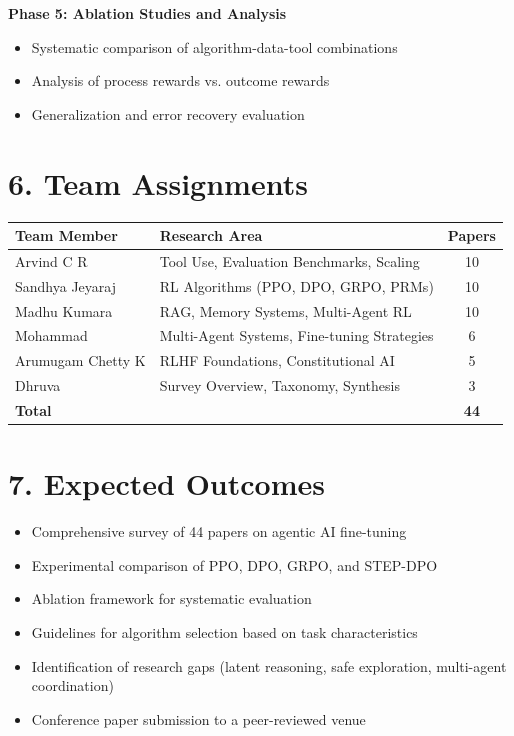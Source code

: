 \documentclass[12pt]{article}
\begin{document}
\textbf{Phase 5: Ablation Studies and Analysis}
\begin{itemize}
    \item Systematic comparison of algorithm-data-tool combinations
    \item Analysis of process rewards vs. outcome rewards
    \item Generalization and error recovery evaluation
\end{itemize}

\section*{6. Team Assignments}

\begin{table}[h]
\centering
\begin{tabular}{@{}llc@{}}
\toprule
\textbf{Team Member} & \textbf{Research Area} & \textbf{Papers} \\
\midrule
Arvind C R & Tool Use, Evaluation Benchmarks, Scaling & 10 \\
Sandhya Jeyaraj & RL Algorithms (PPO, DPO, GRPO, PRMs) & 10 \\
Madhu Kumara & RAG, Memory Systems, Multi-Agent RL & 10 \\
Mohammad & Multi-Agent Systems, Fine-tuning Strategies & 6 \\
Arumugam Chetty K & RLHF Foundations, Constitutional AI & 5 \\
Dhruva & Survey Overview, Taxonomy, Synthesis & 3 \\
\midrule
\textbf{Total} & & \textbf{44} \\
\bottomrule
\end{tabular}
\end{table}

\section*{7. Expected Outcomes}

\begin{itemize}
    \item Comprehensive survey of 44 papers on agentic AI fine-tuning
    \item Experimental comparison of PPO, DPO, GRPO, and STEP-DPO
    \item Ablation framework for systematic evaluation
    \item Guidelines for algorithm selection based on task characteristics
    \item Identification of research gaps (latent reasoning, safe exploration, multi-agent coordination)
    \item Conference paper submission to a peer-reviewed venue
\end{itemize}
\end{document}
